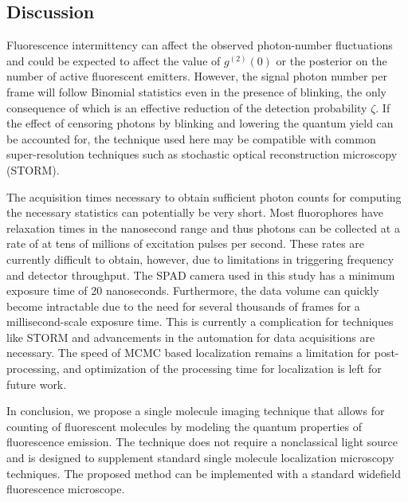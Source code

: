 
\subsection{Discussion}

Fluorescence intermittency can affect the observed photon-number fluctuations and could be expected to affect the value of $g^{(2)}(0)$ or the posterior on the number of active fluorescent emitters. However, the signal photon number per frame will follow Binomial statistics even in the presence of blinking, the only consequence of which is an effective reduction of the detection probability $\zeta$. If the effect of censoring photons by blinking and lowering the quantum yield can be accounted for, the technique used here may be compatible with common super-resolution techniques such as stochastic optical reconstruction microscopy (STORM). 

The acquisition times necessary to obtain sufficient photon counts for computing the necessary statistics can potentially be very short. Most fluorophores have relaxation times in the nanosecond range and thus photons can be collected at a rate of at tens of millions of excitation pulses per second. These rates are currently difficult to obtain, however, due to limitations in triggering frequency and detector throughput. The SPAD camera used in this study has a minimum exposure time of 20 nanoseconds. Furthermore, the data volume can quickly become intractable due to the need for several thousands of frames for a millisecond-scale exposure time. This is currently a complication for techniques like STORM and advancements in the automation for data acquisitions are necessary. The speed of MCMC based localization remains a limitation for post-processing, and optimization of the processing time for localization is left for future work. 

In conclusion, we propose a single molecule imaging technique that allows for counting of fluorescent molecules by modeling the quantum properties of fluorescence emission. The technique does not require a nonclassical light source and is designed to supplement standard single molecule localization microscopy techniques. The proposed method can be implemented with a standard widefield fluorescence microscope.

